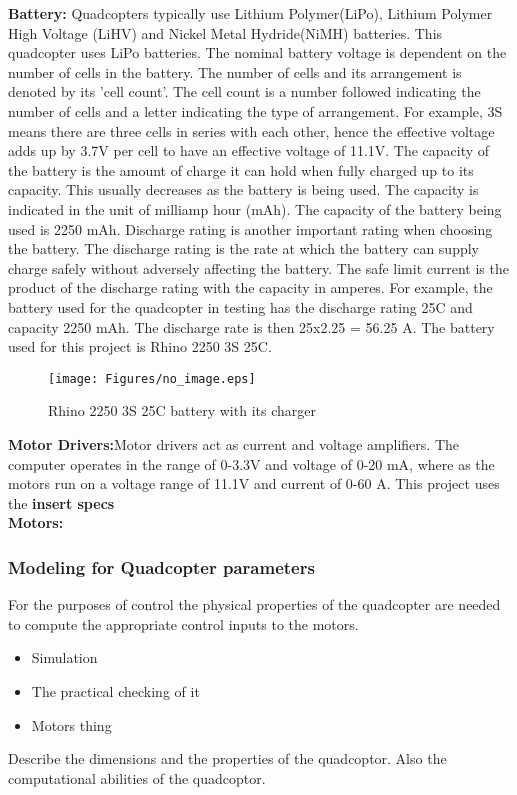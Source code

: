 \documentclass{article}
\begin{document}
\textbf{Battery:} Quadcopters typically use Lithium Polymer(LiPo), Lithium Polymer High Voltage (LiHV) and Nickel Metal Hydride(NiMH) batteries. This quadcopter uses LiPo batteries. The nominal battery voltage is dependent on the number of cells in the battery. The number of cells and its arrangement is denoted by its 'cell count'. The cell count is a number followed indicating the number of cells and a letter indicating the type of arrangement. For example, 3S means there are three cells in series with each other, hence the effective voltage adds up by 3.7V per cell to have an effective voltage of 11.1V. The capacity of the battery is the amount of charge it can hold when fully charged up to its capacity. This usually decreases as the battery is being used. The capacity is indicated in the unit of milliamp hour (mAh). The capacity of the battery being used is 2250 mAh. Discharge rating is another important rating when choosing the battery. The discharge rating is the rate at which the battery can supply charge safely without adversely affecting the battery. The safe limit current is the product of the discharge rating with the capacity in amperes. For example, the battery used for the quadcopter in testing has the discharge rating 25C and capacity 2250 mAh. The discharge rate is then 25x2.25 = 56.25 A. The battery used for this project is Rhino 2250 3S 25C. 
\begin{figure}[H]
\centering
\texttt{[image: Figures/no\_image.eps]}
\caption{Rhino 2250 3S 25C battery with its charger}
\label{quad_red_balls}
\end{figure}
\textbf{Motor Drivers:}Motor drivers act as current and voltage amplifiers. The computer operates in the range of 0-3.3V and voltage of 0-20 mA, where as the motors run on a voltage range of 11.1V and current of 0-60 A. This project uses the \textbf{insert specs}  \\ 
\textbf{Motors:}\\

\subsubsection{Modeling for Quadcopter parameters}
For the purposes of control the physical properties of the quadcopter are needed to compute the appropriate control inputs to the motors. 
\begin{itemize}
	\item Simulation
	\item The practical checking of it
	\item Motors thing
\end{itemize}
Describe the dimensions and the properties of the quadcoptor. Also the computational abilities of the quadcoptor. 
\end{document}

